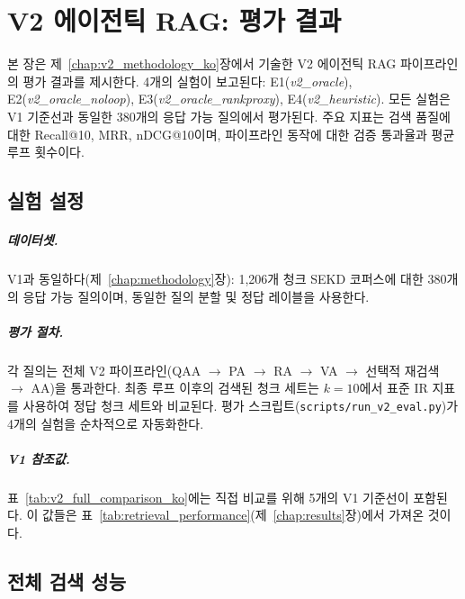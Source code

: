 
\chapter{V2 에이전틱 RAG: 평가 결과}
\label{chap:v2_results_ko}

본 장은 제~\ref{chap:v2_methodology_ko}장에서 기술한 V2 에이전틱 RAG 파이프라인의 평가 결과를 제시한다. 4개의 실험이 보고된다: E1(\textit{v2\_oracle}), E2(\textit{v2\_oracle\_noloop}), E3(\textit{v2\_oracle\_rankproxy}), E4(\textit{v2\_heuristic}). 모든 실험은 V1 기준선과 동일한 380개의 응답 가능 질의에서 평가된다. 주요 지표는 검색 품질에 대한 Recall@10, MRR, nDCG@10이며, 파이프라인 동작에 대한 검증 통과율과 평균 루프 횟수이다.

\section{실험 설정}
\label{sec:v2_setup_ko}

\paragraph{데이터셋.} V1과 동일하다(제~\ref{chap:methodology}장): 1,206개 청크 SEKD 코퍼스에 대한 380개의 응답 가능 질의이며, 동일한 질의 분할 및 정답 레이블을 사용한다.

\paragraph{평가 절차.} 각 질의는 전체 V2 파이프라인(QAA $\to$ PA $\to$ RA $\to$ VA $\to$ 선택적 재검색 $\to$ AA)을 통과한다. 최종 루프 이후의 검색된 청크 세트는 $k{=}10$에서 표준 IR 지표를 사용하여 정답 청크 세트와 비교된다. 평가 스크립트(\texttt{scripts/run\_v2\_eval.py})가 4개의 실험을 순차적으로 자동화한다.

\paragraph{V1 참조값.} 표~\ref{tab:v2_full_comparison_ko}에는 직접 비교를 위해 5개의 V1 기준선이 포함된다. 이 값들은 표~\ref{tab:retrieval_performance}(제~\ref{chap:results}장)에서 가져온 것이다.


\section{전체 검색 성능}
\label{sec:v2_overall_ko}


